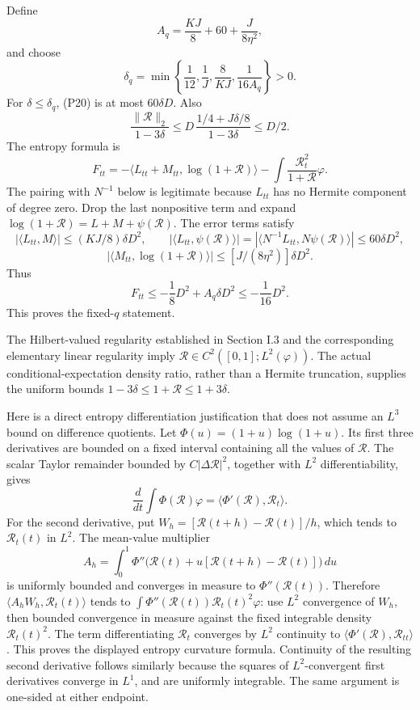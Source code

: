 \documentclass[
  british,
  10pt,
]{article}
\begin{document}
Define \[
A_q=\frac{KJ}{8}+60+\frac{J}{8\eta^2},
\] and choose \[
\boxed{\quad
\delta_q=\min\left\{\frac1{12},\frac1J,\frac8{KJ},
\frac1{16A_q}\right\}>0.
\quad}                                                   \tag{P21}
\] For \(\delta\le\delta_q\), (P20) is at most \(60\delta D\). Also \[
\frac{\|\mathcal R\|_2}{1-3\delta}
\le D\,\frac{1/4+J\delta/8}{1-3\delta}
\le D/2.
\] The entropy formula is \[
F_{tt}=-\langle L_{tt}+M_{tt},\log(1+\mathcal R)\rangle
-\int\frac{\mathcal R_t^2}{1+\mathcal R}\varphi.
\] The pairing with \(N^{-1}\) below is legitimate because \(L_{tt}\)
has no Hermite component of degree zero. Drop the last nonpositive term
and expand \(\log(1+\mathcal R)=L+M+\psi(\mathcal R)\). The error terms
satisfy \[
|\langle L_{tt},M\rangle|\le(KJ/8)\delta D^2,\qquad
|\langle L_{tt},\psi(\mathcal R)\rangle|=|\langle N^{-1}L_{tt},N\psi(\mathcal R)\rangle|\le60\delta D^2,
\] \[
|\langle M_{tt},\log(1+\mathcal R)\rangle|
\le[J/(8\eta^2)]\delta D^2.
\] Thus \[
F_{tt}\le-\frac18D^2+A_q\delta D^2\le-\frac1{16}D^2.
\] This proves the fixed-\(q\) statement.

The Hilbert-valued regularity established in Section I.3 and the
corresponding elementary linear regularity imply
\(\mathcal R\in C^2([0,1];L^2(\varphi))\). The actual
conditional-expectation density ratio, rather than a Hermite truncation,
supplies the uniform bounds \(1-3\delta\le1+\mathcal R\le1+3\delta\).

Here is a direct entropy differentiation justification that does not
assume an \(L^3\) bound on difference quotients. Let
\(\Phi(u)=(1+u)\log(1+u)\). Its first three derivatives are bounded on a
fixed interval containing all the values of \(\mathcal R\). The scalar
Taylor remainder bounded by \(C|\Delta\mathcal R|^2\), together with
\(L^2\) differentiability, gives \[
\frac{d}{dt}\int\Phi(\mathcal R)\varphi
=\langle\Phi'(\mathcal R),\mathcal R_t\rangle .
\] For the second derivative, put
\(W_h=[\mathcal R(t+h)-\mathcal R(t)]/h\), which tends to
\(\mathcal R_t(t)\) in \(L^2\). The mean-value multiplier \[
A_h=\int_0^1\Phi''\big(\mathcal R(t)+u[\mathcal R(t+h)-\mathcal R(t)]\big)\,du
\] is uniformly bounded and converges in measure to
\(\Phi''(\mathcal R(t))\). Therefore
\(\langle A_hW_h,\mathcal R_t(t)\rangle\) tends to
\(\int\Phi''(\mathcal R(t))\mathcal R_t(t)^2\varphi\): use \(L^2\)
convergence of \(W_h\), then bounded convergence in measure against the
fixed integrable density \(\mathcal R_t(t)^2\). The term differentiating
\(\mathcal R_t\) converges by \(L^2\) continuity to
\(\langle\Phi'(\mathcal R),\mathcal R_{tt}\rangle\). This proves the
displayed entropy curvature formula. Continuity of the resulting second
derivative follows similarly because the squares of \(L^2\)-convergent
first derivatives converge in \(L^1\), and are uniformly integrable. The
same argument is one-sided at either endpoint.
\end{document}
